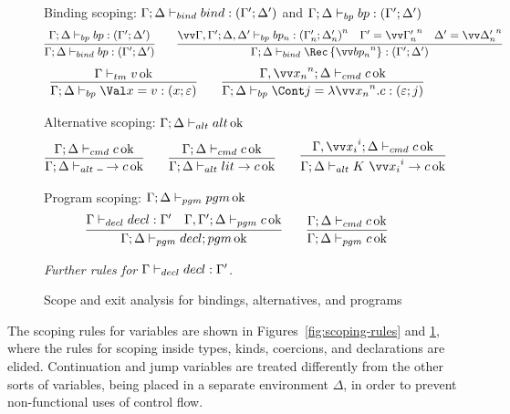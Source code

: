 \documentclass{article}
\begin{document}
\begin{figure}
\centering

Binding scoping: $\Gamma; \Delta \vdash_{bind} bind : (\Gamma'; \Delta')$ and
$\Gamma; \Delta \vdash_{bp} bp : (\Gamma'; \Delta')$
\begin{gather*}
  \infer
  {\scopebind{\Gamma}{\Delta}{\nonrec{\bp}}{\Gamma'}{\Delta'}}
  {\scopebp{\Gamma}{\Delta}{\bp}{\Gamma'}{\Delta'}}
  \qquad
  \infer
  {\scopebind{\Gamma}{\Delta}{\rec{\vect[n]{\bp_n}}}{\Gamma'}{\Delta'}}
  {
    \vect[n]{
      \scopebp{\Gamma,\Gamma'}{\Delta,\Delta'}{\bp_n}{\Gamma'_n}{\Delta'_n}
    }
    &
    \Gamma' = \vect[n]{\Gamma'_n}
    &
    \Delta' = \vect[n]{\Delta'_n}
  }
\end{gather*}
\begin{gather*}
  \infer
  {\scopebp{\Gamma}{\Delta}{\bindv{x}{\tm}}{x}{\mt}}
  {\scopetm{\Gamma}{\tm}}
  \qquad
  \infer
  {\scopebp{\Gamma}{\Delta}{\bindk{j}{\fnk{\vect[n]{x_n}}\cmd}}{\mt}{j}}
  {\scopecmd{\Gamma,\vect[n]{x_n}}{\Delta}{\cmd}}
\end{gather*}

Alternative scoping: $\Gamma; \Delta \vdash_{alt} alt \operatorname{ok}$
\begin{gather*}
  \infer
  {\scopealt{\Gamma}{\Delta}{\alt{\blank}{\cmd}}}
  {\scopecmd{\Gamma}{\Delta}{\cmd}}
  \qquad
  \infer
  {\scopealt{\Gamma}{\Delta}{\alt{\lit}{\cmd}}}
  {\scopecmd{\Gamma}{\Delta}{\cmd}}
  \qquad
  \infer
  {\scopealt{\Gamma}{\Delta}{\alt{K ~ \vect[i]{x_i}}{\cmd}}}
  {\scopecmd{\Gamma,\vect[i]{x_i}}{\Delta}{\cmd}}
\end{gather*}

Program scoping: $\Gamma; \Delta \vdash_{pgm} pgm \operatorname{ok}$
\begin{gather*}
  \infer
  {\scopepgm{\Gamma}{\Delta}{\decl; \pgm}}
  {
    \scopedecl{\Gamma}{\decl}{\Gamma'}
    &
    \scopepgm{\Gamma,\Gamma'}{\Delta}{c}
  }
  \qquad
  \infer
  {\scopepgm{\Gamma}{\Delta}{\cmd}}
  {\scopecmd{\Gamma}{\Delta}{\cmd}}
\end{gather*}

\emph{Further rules for $\Gamma \vdash_{decl} decl : \Gamma'$.}
\caption{Scope and exit analysis for bindings, alternatives, and
  programs}
\label{fig:scoping-rules-binds}
\end{figure}

The scoping rules for variables are shown in Figures~\ref{fig:scoping-rules} and
\ref{fig:scoping-rules-binds}, where the rules for scoping inside types, kinds,
coercions, and declarations are elided.  Continuation and jump variables are
treated differently from the other sorts of variables, being placed in a
separate environment $\Delta$, in order to prevent non-functional uses of
control flow.
\end{document}
